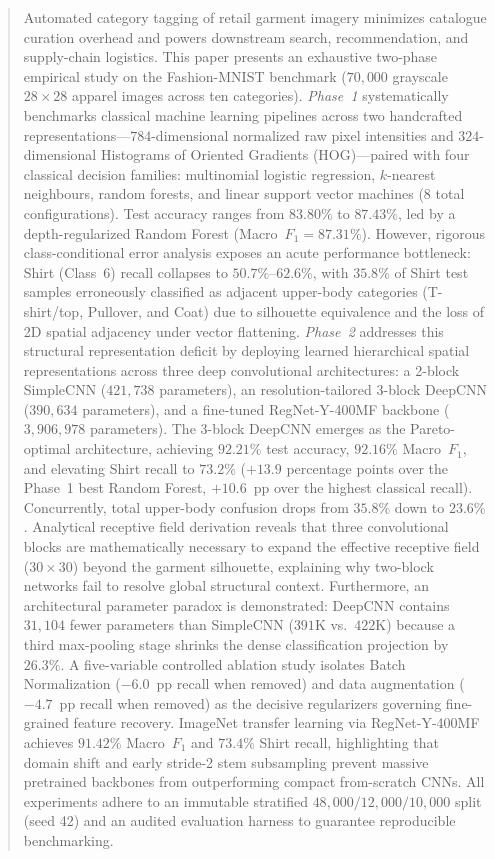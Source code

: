 \documentclass[conference]{IEEEtran}
\begin{document}
\begin{abstract}
Automated category tagging of retail garment imagery minimizes catalogue curation overhead and powers downstream search, recommendation, and supply-chain logistics. This paper presents an exhaustive two-phase empirical study on the Fashion-MNIST benchmark ($70{,}000$ grayscale $28\times28$ apparel images across ten categories). 
\emph{Phase~1} systematically benchmarks classical machine learning pipelines across two handcrafted representations---$784$-dimensional normalized raw pixel intensities and $324$-dimensional Histograms of Oriented Gradients (HOG)---paired with four classical decision families: multinomial logistic regression, $k$-nearest neighbours, random forests, and linear support vector machines ($8$ total configurations). Test accuracy ranges from $83.80\%$ to $87.43\%$, led by a depth-regularized Random Forest (Macro~$F_1 = 87.31\%$). However, rigorous class-conditional error analysis exposes an acute performance bottleneck: Shirt (Class~6) recall collapses to $50.7\%$--$62.6\%$, with $35.8\%$ of Shirt test samples erroneously classified as adjacent upper-body categories (T-shirt/top, Pullover, and Coat) due to silhouette equivalence and the loss of 2D spatial adjacency under vector flattening.
\emph{Phase~2} addresses this structural representation deficit by deploying learned hierarchical spatial representations across three deep convolutional architectures: a 2-block SimpleCNN ($421{,}738$ parameters), an resolution-tailored 3-block DeepCNN ($390{,}634$ parameters), and a fine-tuned RegNet-Y-400MF backbone ($3{,}906{,}978$ parameters). 
The 3-block DeepCNN emerges as the Pareto-optimal architecture, achieving $92.21\%$ test accuracy, $92.16\%$ Macro~$F_1$, and elevating Shirt recall to $73.2\%$ ($+13.9$ percentage points over the Phase~1 best Random Forest, $+10.6$~pp over the highest classical recall). Concurrently, total upper-body confusion drops from $35.8\%$ down to $23.6\%$.
Analytical receptive field derivation reveals that three convolutional blocks are mathematically necessary to expand the effective receptive field ($30 \times 30$) beyond the garment silhouette, explaining why two-block networks fail to resolve global structural context. Furthermore, an architectural parameter paradox is demonstrated: DeepCNN contains $31{,}104$ fewer parameters than SimpleCNN ($391\text{K}$ vs.\ $422\text{K}$) because a third max-pooling stage shrinks the dense classification projection by $26.3\%$.
A five-variable controlled ablation study isolates Batch Normalization ($-6.0$~pp recall when removed) and data augmentation ($-4.7$~pp recall when removed) as the decisive regularizers governing fine-grained feature recovery. ImageNet transfer learning via RegNet-Y-400MF achieves $91.42\%$ Macro~$F_1$ and $73.4\%$ Shirt recall, highlighting that domain shift and early stride-2 stem subsampling prevent massive pretrained backbones from outperforming compact from-scratch CNNs. All experiments adhere to an immutable stratified $48{,}000/12{,}000/10{,}000$ split (seed 42) and an audited evaluation harness to guarantee reproducible benchmarking.
\end{abstract}
\end{document}
